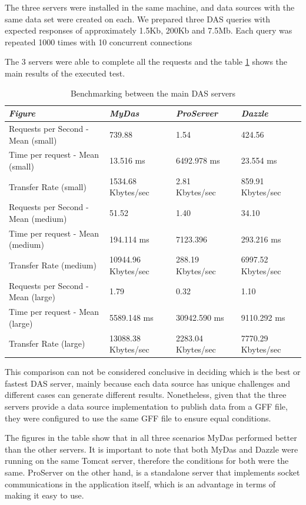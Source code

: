 The three servers were installed in the same machine, and data sources with the same data set were created on each. We prepared three DAS queries with expected responses of approximately 1.5Kb, 200Kb and 7.5Mb. Each query was repeated 1000 times with 10 concurrent connections

The 3 servers were able to complete all the requests and the table \ref{tab:table2} shows the main results of the executed test.

\begin{table}[!ht]
        \begin{tabular}{|p{6cm}|p{3cm}|p{3cm}|p{3cm}|}
\hline 
\emph{Figure} & \emph{MyDas} & \emph{ProServer} & \emph{Dazzle}\\
\hline 
Requests per Second - Mean (small) & 739.88 & 1.54 & 424.56\\
\hline 
Time per request - Mean (small) & 13.516 ms & 6492.978 ms & 23.554 ms\\
\hline 
Transfer Rate (small) & 1534.68 Kbytes/sec & 2.81 Kbytes/sec & 859.91 Kbytes/sec\\
\hline 
Requests per Second - Mean (medium) & 51.52 & 1.40 & 34.10\\
\hline 
Time per request - Mean (medium) & 194.114 ms & 7123.396 & 293.216 ms\\
\hline 
Transfer Rate (medium) & 10944.96 Kbytes/sec & 288.19 Kbytes/sec & 6997.52 Kbytes/sec\\
\hline 
Requests per Second - Mean (large) & 1.79 & 0.32 & 1.10\\
\hline 
Time per request - Mean (large) & 5589.148 ms & 30942.590 ms & 9110.292 ms\\
\hline 
Transfer Rate (large) & 13088.38 Kbytes/sec & 2283.04 Kbytes/sec & 7770.29 Kbytes/sec\\
\hline 
        \end{tabular}
        \caption{Benchmarking between the main DAS servers}
        \label{tab:table2}
\end{table}

This comparison can not be considered conclusive in deciding which is the best or fastest DAS server, mainly because each data source has unique challenges and different cases can generate different results. Nonetheless, given that the three servers provide a data source implementation to publish data from a GFF file, they were configured to use the same GFF file to ensure equal conditions. 

The figures in the table show that in all three scenarios MyDas performed better than the other servers. It is important to note that both MyDas and Dazzle were running on the same Tomcat server, therefore the conditions for both were the same. ProServer on the other hand, is a standalone server that implements socket communications in the application itself, which is an advantage in terms of making it easy to use.

